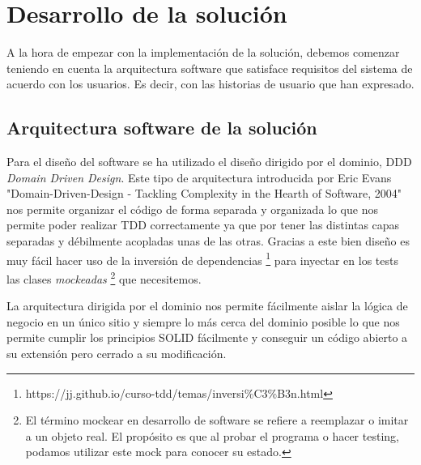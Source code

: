 \chapter{Desarrollo de la solución}
A la hora de empezar con la implementación de la solución, debemos comenzar teniendo en
cuenta la arquitectura software que satisface requisitos del sistema de acuerdo con los
usuarios. Es decir, con las historias de usuario que han expresado.

\section{Arquitectura software de la solución}
Para el diseño del software se ha utilizado el diseño dirigido por el dominio, DDD
\textit{Domain Driven Design}. Este tipo de arquitectura introducida por Eric Evans
\cite{ddd_book} "Domain-Driven-Design - Tackling Complexity in the Hearth of Software,
2004" nos permite organizar el código de forma separada y organizada lo que nos permite
poder realizar TDD correctamente ya que por tener las distintas capas separadas y
débilmente acopladas unas de las otras. Gracias a este bien diseño es muy fácil hacer uso
de la inversión de dependencias
\footnote{https://jj.github.io/curso-tdd/temas/inversi\%C3\%B3n.html} para inyectar en los
tests las clases \textit{mockeadas} \footnote{El término mockear en desarrollo de software
se refiere a reemplazar o imitar a un objeto real. El propósito es que al probar el
programa o hacer testing, podamos utilizar este mock para conocer su estado.} que
necesitemos. 

La arquitectura dirigida por el dominio nos permite fácilmente aislar la lógica de negocio
en un único sitio y siempre lo más cerca del dominio posible lo que nos permite cumplir
los principios SOLID fácilmente y conseguir un código abierto a su extensión pero cerrado
a su modificación.  

